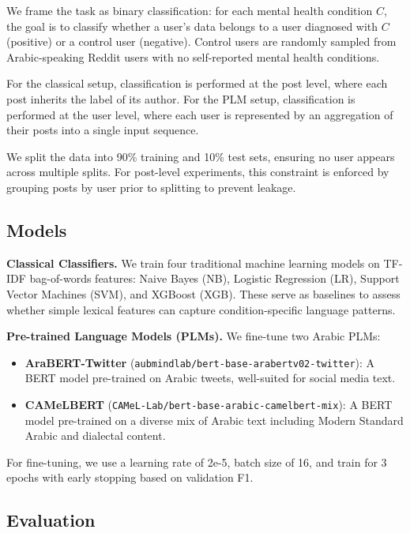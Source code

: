 \documentclass[11pt]{article}
\begin{document}
We frame the task as binary classification: for each mental health condition $C$, the goal is to classify whether a user's data belongs to a user diagnosed with $C$ (positive) or a control user (negative). Control users are randomly sampled from Arabic-speaking Reddit users with no self-reported mental health conditions.

For the classical setup, classification is performed at the post level, where each post inherits the label of its author. For the PLM setup, classification is performed at the user level, where each user is represented by an aggregation of their posts into a single input sequence.

We split the data into 90\% training and 10\% test sets, ensuring no user appears across multiple splits. For post-level experiments, this constraint is enforced by grouping posts by user prior to splitting to prevent leakage.


\subsection{Models}
\label{subsec:models}

\textbf{Classical Classifiers.} We train four traditional machine learning models on TF-IDF bag-of-words features: Naive Bayes (NB), Logistic Regression (LR), Support Vector Machines (SVM), and XGBoost (XGB). These serve as baselines to assess whether simple lexical features can capture condition-specific language patterns.

\textbf{Pre-trained Language Models (PLMs).} We fine-tune two Arabic PLMs:
\begin{itemize}
    \item \textbf{AraBERT-Twitter} (\texttt{aubmindlab/bert-base-arabertv02-twitter}): A BERT model pre-trained on Arabic tweets, well-suited for social media text.
    \item \textbf{CAMeLBERT} (\texttt{CAMeL-Lab/bert-base-arabic-camelbert-mix}): A BERT model pre-trained on a diverse mix of Arabic text including Modern Standard Arabic and dialectal content.
\end{itemize}
For fine-tuning, we use a learning rate of 2e-5, batch size of 16, and train for 3 epochs with early stopping based on validation F1.

\subsection{Evaluation}
\label{subsec:eval}
\end{document}
